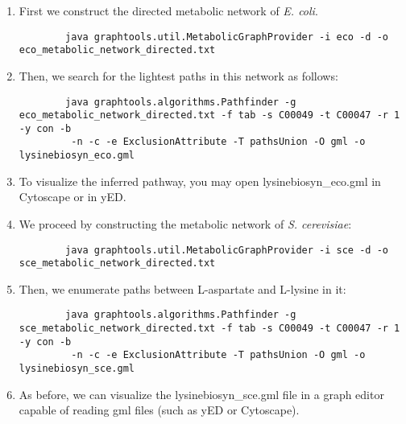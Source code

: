 \begin{enumerate}

\item First we construct the directed metabolic network of \textit{E. coli}.

        {\color{Blue} \begin{footnotesize}
		\begin{verbatim}
		java graphtools.util.MetabolicGraphProvider -i eco -d -o eco_metabolic_network_directed.txt
		\end{verbatim} \end{footnotesize}
		}

\item Then, we search for the lightest paths in this network as follows:

		{\color{Blue} \begin{footnotesize}
		\begin{verbatim}
		java graphtools.algorithms.Pathfinder -g eco_metabolic_network_directed.txt -f tab -s C00049 -t C00047 -r 1 -y con -b
		 -n -c -e ExclusionAttribute -T pathsUnion -O gml -o lysinebiosyn_eco.gml
		\end{verbatim} \end{footnotesize}
		}

\item To visualize the inferred pathway, you may open lysinebiosyn_eco.gml in Cytoscape or in yED.


\item We proceed by constructing the metabolic network of \textit{S. cerevisiae}:

	 {\color{Blue} \begin{footnotesize}
		\begin{verbatim}
		java graphtools.util.MetabolicGraphProvider -i sce -d -o sce_metabolic_network_directed.txt
		\end{verbatim} \end{footnotesize}
		}

\item Then, we enumerate paths between L-aspartate and L-lysine in it:

		{\color{Blue} \begin{footnotesize}
		\begin{verbatim}
		java graphtools.algorithms.Pathfinder -g sce_metabolic_network_directed.txt -f tab -s C00049 -t C00047 -r 1 -y con -b
		 -n -c -e ExclusionAttribute -T pathsUnion -O gml -o lysinebiosyn_sce.gml
		\end{verbatim} \end{footnotesize}
		}

\item As before, we can visualize the lysinebiosyn_sce.gml file in a graph editor capable of reading gml files
     (such as yED or Cytoscape).

\end{enumerate}

